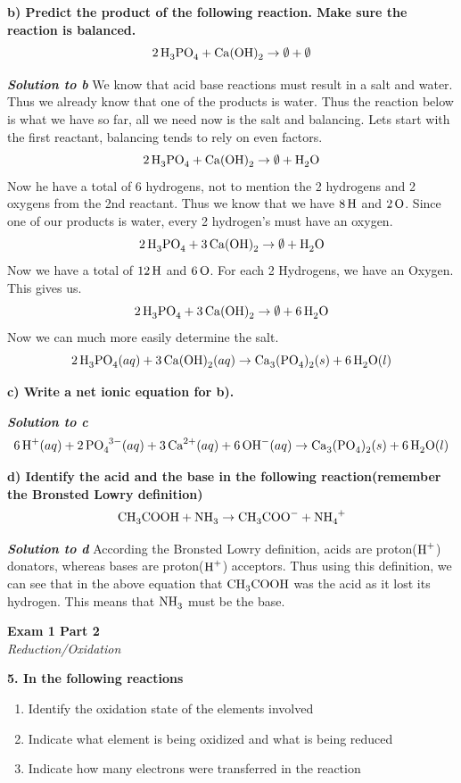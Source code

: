 \documentclass{article}
\begin{document}
    \textbf{b) Predict the product of the following reaction. Make sure the reaction is balanced.}
    $$\ce{2H3PO4} + \ce{Ca(OH)2} \rightarrow \emptyset + \emptyset$$

    \textbf{\textit{Solution to b}}
    We know that acid base reactions must result in a salt and water. Thus we already know that one of the products is water. Thus the reaction below is what we have so far, all we need now is the salt and balancing. Lets start with the first reactant, balancing tends to rely on even factors.
    $$\ce{2H3PO4} + \ce{Ca(OH)2} \rightarrow \emptyset + \ce{H2O}$$
    Now he have a total of 6 hydrogens, not to mention the 2 hydrogens and 2 oxygens from the 2nd reactant. Thus we know that we have $\ce{8H}$ and $\ce{2O}$. Since one of our products is water, every 2 hydrogen's must have an oxygen.
    $$\ce{2H3PO4} + \ce{3Ca(OH)2} \rightarrow \emptyset + \ce{H2O}$$
    Now we have a total of $\ce{12H}$ and $\ce{6O}$. For each 2 Hydrogens, we have an Oxygen. This gives us.
    $$\ce{2H3PO4} + \ce{3Ca(OH)2} \rightarrow \emptyset + \ce{6H2O}$$
    Now we can much more easily determine the salt.
    $$\ce{2H3PO4}(aq) + \ce{3Ca(OH)2}(aq) \rightarrow \ce{Ca3(PO4)2}(s) + \ce{6H2O}(l)$$

    \textbf{c) Write a net ionic equation for b).}

    \textbf{\textit{Solution to c}}
    $$\ce{6H^{+}} (aq) + \ce{2PO4^{3-}} (aq) + \ce{3Ca^{2+}} (aq) + \ce{6OH^{-}} (aq) \rightarrow \ce{Ca3(PO4)2}(s) + \ce{6H2O}(l)$$

    \textbf{d) Identify the acid and the base in the following reaction(remember the Bronsted Lowry definition)}
    $$\ce{CH_{3}COOH} + \ce{NH_{3}} \rightarrow \ce{CH_{3}COO^{-}} + \ce{NH_{4}^{+}}$$

    \textbf{\textit{Solution to d}}
    According the Bronsted Lowry definition, acids are proton($\ce{H+}$) donators, whereas bases are proton($\ce{H+}$) acceptors. Thus using this definition, we can see that in the above equation that $\ce{CH_{3}COOH}$ was the acid as it lost its hydrogen. This means that $\ce{NH_{3}}$ must be the base.

    \pagebreak


    \begin{center}
        \textbf{Exam 1 Part 2}\\
        \textit{Reduction/Oxidation}
    \end{center}
    \textbf{5. In the following reactions}
    \begin{enumerate}
        \item Identify the oxidation state of the elements involved
        \item Indicate what element is being oxidized and what is being reduced
        \item Indicate how many electrons were transferred in the reaction\\[1cm]
    \end{enumerate}
\end{document}

